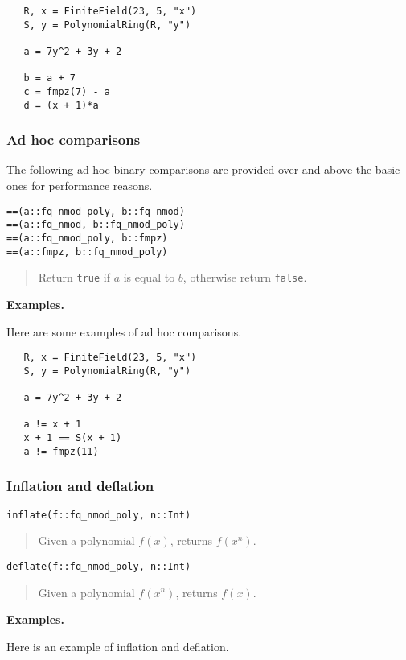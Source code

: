 \documentclass[a4paper,10pt]{article}
\newcommand{\code}{\lstinline}
\newcommand{\desc}[1]{\vspace{-3mm}\begin{quote}#1\end{quote}}
\begin{document}
{{\begin{lstlisting}
   R, x = FiniteField(23, 5, "x")
   S, y = PolynomialRing(R, "y")

   a = 7y^2 + 3y + 2

   b = a + 7
   c = fmpz(7) - a
   d = (x + 1)*a
\end{lstlisting}

\subsubsection{Ad hoc comparisons}

The following ad hoc binary comparisons are provided over and above the basic ones
for performance reasons.

\begin{lstlisting}
==(a::fq_nmod_poly, b::fq_nmod)
==(a::fq_nmod, b::fq_nmod_poly)
==(a::fq_nmod_poly, b::fmpz)
==(a::fmpz, b::fq_nmod_poly)
\end{lstlisting}

\desc{Return \code{true} if $a$ is equal to $b$, otherwise return \code{false}.}

\textbf{Examples.}

Here are some examples of ad hoc comparisons.

\begin{lstlisting}
   R, x = FiniteField(23, 5, "x")
   S, y = PolynomialRing(R, "y")

   a = 7y^2 + 3y + 2

   a != x + 1
   x + 1 == S(x + 1)
   a != fmpz(11)
\end{lstlisting}

\subsubsection{Inflation and deflation}

\begin{lstlisting}
inflate(f::fq_nmod_poly, n::Int)
\end{lstlisting}

\desc{Given a polynomial $f(x)$, returns $f(x^n)$.}

\begin{lstlisting}
deflate(f::fq_nmod_poly, n::Int)
\end{lstlisting}

\desc{Given a polynomial $f(x^n)$, returns $f(x)$.}

\textbf{Examples.}

Here is an example of inflation and deflation.

}}
\end{document}
